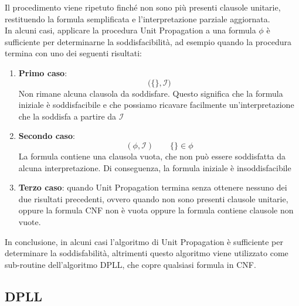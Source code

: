 Il procedimento viene ripetuto finché non sono
più presenti clausole unitarie, restituendo
la formula semplificata e l'interpretazione
parziale aggiornata.\\
In alcuni casi, applicare la procedura Unit Propagation a una formula \(\phi\) è sufficiente per determinarne la soddisfacibilità, 
ad esempio quando la procedura termina con uno dei seguenti risultati:
\begin{enumerate}
    \item \textbf{Primo caso}:
    \[   \Big(\{\}, \mathcal{I}\Big)    \]
    Non rimane alcuna clausola da soddisfare. Questo significa che la formula iniziale è soddisfacibile 
e che possiamo ricavare facilmente un'interpretazione che la soddisfa a partire da \(\mathcal I\)
\item \textbf{Secondo caso}:
\[      (\phi,\mathcal I)\qquad \{\}\in\phi       \]
La formula contiene una clausola vuota, che non può essere soddisfatta da alcuna interpretazione. Di conseguenza, la formula iniziale è insoddisfacibile

\item \textbf{Terzo caso}: quando Unit Propagation termina senza ottenere nessuno dei due risultati precedenti, ovvero quando non sono presenti clausole unitarie, oppure 
la formula CNF non è vuota oppure la formula contiene clausole non vuote.
\end{enumerate}
In conclusione, in alcuni casi l'algoritmo di Unit Propagation è sufficiente per determinare la soddisfabilità, altrimenti questo algoritmo viene utilizzato come sub-routine 
dell'algoritmo DPLL, che copre qualsiasi formula in CNF.  





\subsection{DPLL}

